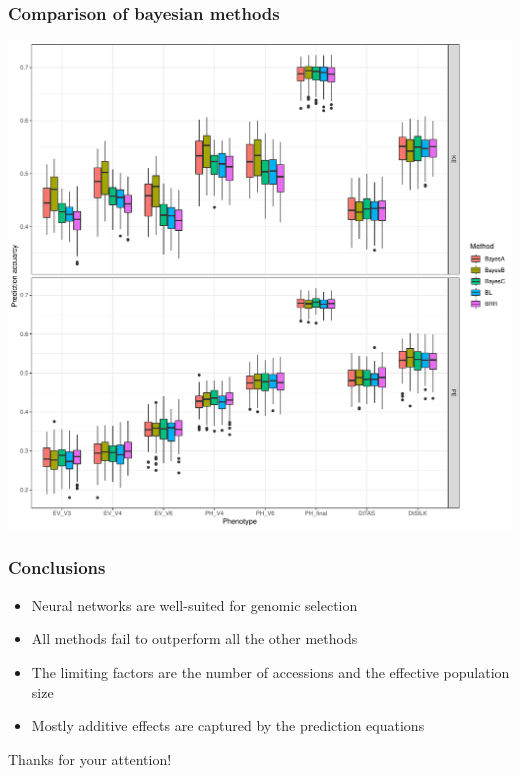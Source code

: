\documentclass{beamer}
\begin{document}
\begin{frame}
  \frametitle{Comparison of bayesian methods}
  \includegraphics[height=.8\textheight,width=.9\textwidth]{pred_acc_bayes}
\end{frame}


\begin{frame}
  \frametitle{Conclusions}
  \begin{itemize} [<+->]
  \item Neural networks are well-suited for genomic selection
  \item All methods fail to outperform all the other methods
  \item The limiting factors are the number of accessions and the
    effective population size
  \item Mostly additive effects are captured by the prediction equations
  \end{itemize}
\end{frame}


\begin{frame}
Thanks for your attention!
\end{frame}
\end{document}
